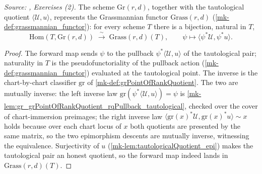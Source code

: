 \begin{theorem}\label{mk-thm:grassmannian_universal_property}
  \leanok

  \textit{Source: \cite{nitsure-hilbert-quot}, Exercises (2).}
  The scheme \(\mathrm{Gr}(r,d)\), together with the tautological quotient
  \(\langle \mathcal{U}, u\rangle\), represents the Grassmannian functor
  \(\mathrm{Grass}(r,d)\) (\ref{mk-def:grassmannian_functor}): for every scheme \(T\) there is a
  bijection, natural in \(T\),
  \[
    \mathrm{Hom}(T, \mathrm{Gr}(r,d)) \;\xrightarrow{\ \sim\ }\; \mathrm{Grass}(r,d)(T),
    \qquad \psi \longmapsto \langle \psi^{*}\mathcal{U}, \psi^{*}u\rangle .
  \]
\end{theorem}
\begin{proof}
  The forward map sends \(\psi\) to the pullback \(\psi^{*}\langle\mathcal{U},u\rangle\) of the
  tautological pair; naturality in \(T\) is the pseudofunctoriality of the pullback action
  (\ref{mk-def:grassmannian_functor}) evaluated at the tautological point. The inverse is the
  chart-by-chart classifier \(\mathrm{gr}\) of \ref{mk-def:grPointOfRankQuotient}. The two are
  mutually inverse: the left inverse law
  \(\mathrm{gr}(\psi^{*}\langle\mathcal{U},u\rangle) = \psi\) is
  \ref{mk-lem:gr_grPointOfRankQuotient_rqPullback_tautological}, checked over the cover of
  chart-immersion preimages; the right inverse law
  \(\langle\mathrm{gr}(x)^{*}\mathcal{U}, \mathrm{gr}(x)^{*}u\rangle \sim x\) holds because over
  each chart locus of \(x\) both quotients are presented by the same matrix, so the two
  epimorphism descents are mutually inverse, witnessing the equivalence. Surjectivity of \(u\)
  (\ref{mk-lem:tautologicalQuotient_epi}) makes the tautological pair an honest quotient, so the
  forward map indeed lands in \(\mathrm{Grass}(r,d)(T)\).
\end{proof}
